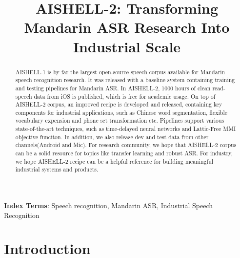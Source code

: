 \documentclass[a4paper]{article}
\title{AISHELL-2: Transforming Mandarin ASR Research Into Industrial Scale}
\begin{document}
\maketitle
%
\begin{abstract}
AISHELL-1 is by far the largest open-source speech corpus available for Mandarin
speech recognition research. It was released with a baseline system containing
training and testing pipelines for Mandarin ASR. In AISHELL-2, 1000 hours of
clean read-speech data from iOS is published, which is free for academic usage. On top of
AISHELL-2 corpus, an improved recipe is developed and released, containing key
components for industrial applications, such as Chinese word segmentation,
flexible vocabulary expension and phone set transformation etc. 
Pipelines support various state-of-the-art techniques, such
as time-delayed neural networks and Lattic-Free MMI objective funciton. 
In addition, we also release dev and test data from other channels(Android and Mic). 
For research community, we hope that AISHELL-2
corpus can be a solid resource for topics like transfer learning and robust
ASR. For industry, we hope AISHELL-2 recipe can be a helpful reference for
building meaningful industrial systems and products.
\end{abstract}
\noindent\textbf{Index Terms}: Speech recognition, Mandarin ASR, Industrial Speech Recognition

\section{Introduction}
\end{document}
